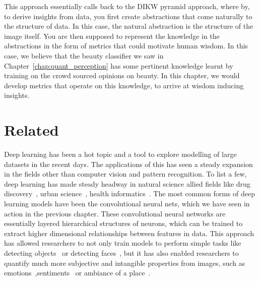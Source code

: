 This approach essentially calls back to the DIKW pyramid approach, where by, to derive insights from data, you first create abstractions that come naturally to the structure of data. In this case, the natural abstraction is the structure of the image itself. You are then supposed to represent the knowledge in the abstractions in the form of metrics that could motivate human wisdom. In this case, we believe that the beauty classifier we saw in Chapter~\ref{chap:quant_perception} has some pertinent knowledge learnt by training on the crowd sourced opinions on beauty. In this chapter, we would develop metrics that operate on this knowledge, to arrive at wisdom inducing insights.


\section{Related}
Deep learning has been a hot topic and a tool to explore modelling of large datasets in the recent days. The applications of this has seen a steady expansion in the fields other than computer vision and pattern recognition. To list a few, deep learning has made steady headway in natural science allied fields like drug discovery~\cite{gawehn2016deep}, urban science~\cite{pang2017deepcity,cordts2016cityscapes,li2017deep}, health informatics~\cite{ravi2016deep}. The most common forms of deep learning models have been the convolutional neural nets, which we have seen in action in the previous chapter. These convolutional neural networks are essentially layered hierarchical structures of neurons, which can be trained to extract higher dimensional relationships between features in data. This approach has allowed researchers to not only train models to perform simple tasks like detecting objects~\cite{krizhevsky2012imagenet} or detecting faces~\cite{ranjan2017hyperface}, but it has also enabled researchers to quantify much more subjective and intangible properties from images, such as emotions~\cite{kim2013deep},sentiments~\cite{SentiBank} or ambiance of a place~\cite{redi2015like}.

